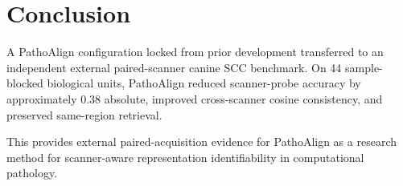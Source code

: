 \documentclass[10pt]{article}
\begin{document}
\section{Conclusion}

A PathoAlign configuration locked from prior development transferred to an independent external paired-scanner canine SCC benchmark. On 44 sample-blocked biological units, PathoAlign reduced scanner-probe accuracy by approximately 0.38 absolute, improved cross-scanner cosine consistency, and preserved same-region retrieval.

This provides external paired-acquisition evidence for PathoAlign as a research method for scanner-aware representation identifiability in computational pathology.
\end{document}
